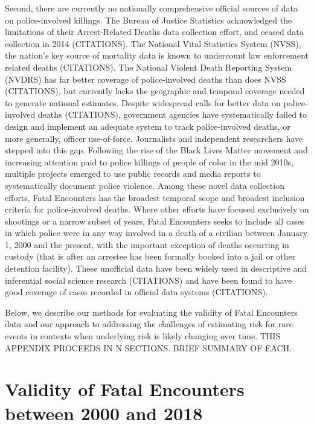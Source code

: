 \documentclass{article}
\begin{document}
Second, there are currently no nationally comprehensive official sources of data on police-involved killings. The Bureau of Justice Statistics acknowledged the limitations of their Arrest-Related Deaths data collection effort, and ceased data collection in 2014 (CITATIONS). The National Vital Statistics System (NVSS), the nation's key source of mortality data is known to undercount law enforcement related deaths (CITATIONS). The National Violent Death Reporting System (NVDRS) has far better coverage of police-involved deaths than does NVSS (CITATIONS), but currently lacks the geographic and temporal coverage needed to generate national estimates. Despite widespread calls for better data on police-involved deaths (CITATIONS), government agencies have systematically failed to design and implement an adequate system to track police-involved deaths, or more generally, officer use-of-force. Journalists and independent researchers have stepped into this gap. Following the rise of the Black Lives Matter movement and increasing attention paid to police killings of people of color in the mid 2010s, multiple projects emerged to use public records and media reports to systematically document police violence. Among these novel data collection efforts, Fatal Encounters has the broadest temporal scope and broadest inclusion criteria for police-involved deaths. Where other efforts have focused exclusively on shootings or a narrow subset of years, Fatal Encounters seeks to include all cases in which police were in any way involved in a death of a civilian between January 1, 2000 and the present, with the important exception of deaths occurring in custody (that is after an arrestee has been formally booked into a jail or other detention facility). These unofficial data have been widely used in descriptive and inferential social science research (CITATIONS) and have been found to have good coverage of cases recorded in official data systems (CITATIONS). 

Below, we describe our methods for evaluating the validity of Fatal Encounters data and our approach to addressing the challenges of estimating risk for rare events in contexts when underlying risk is likely changing over time. THIS APPENDIX PROCEEDS IN N SECTIONS. BRIEF SUMMARY OF EACH.

\section{Validity of Fatal Encounters between 2000 and 2018}
\end{document}
